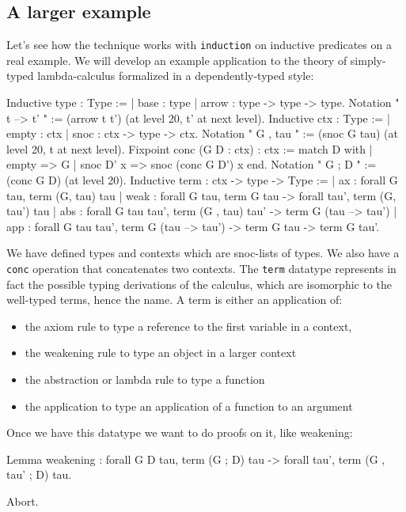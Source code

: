 \subsection{A larger example}

Let's see how the technique works with {\tt induction} on inductive
predicates on a real example. We will develop an example application to the
theory of simply-typed lambda-calculus formalized in a dependently-typed style:

\begin{coq_example*}
Inductive type : Type :=
| base : type
| arrow : type -> type -> type.
Notation " t --> t' " := (arrow t t') (at level 20, t' at next level).
Inductive ctx : Type :=
| empty : ctx
| snoc : ctx -> type -> ctx.
Notation " G , tau " := (snoc G tau) (at level 20, t at next level).
Fixpoint conc (G D : ctx) : ctx :=
  match D with
    | empty => G
    | snoc D' x => snoc (conc G D') x
  end.
Notation " G ; D " := (conc G D) (at level 20).
Inductive term : ctx -> type -> Type :=
| ax : forall G tau, term (G, tau) tau
| weak : forall G tau, 
  term G tau -> forall tau', term (G, tau') tau
| abs : forall G tau tau', 
  term (G , tau) tau' -> term G (tau --> tau')
| app : forall G tau tau', 
  term G (tau --> tau') -> term G tau -> term G tau'.
\end{coq_example*}

We have defined types and contexts which are snoc-lists of types. We
also have a {\tt conc} operation that concatenates two contexts.
The {\tt term} datatype represents in fact the possible typing
derivations of the calculus, which are isomorphic to the well-typed
terms, hence the name. A term is either an application of:
\begin{itemize}
\item the axiom rule to type a reference to the first variable in a context,
\item the weakening rule to type an object in a larger context
\item the abstraction or lambda rule to type a function
\item the application to type an application of a function to an argument
\end{itemize}

Once we have this datatype we want to do proofs on it, like weakening:

\begin{coq_example*}
Lemma weakening : forall G D tau, term (G ; D) tau -> 
  forall tau', term (G , tau' ; D) tau.
\end{coq_example*}
\begin{coq_eval}
  Abort.
\end{coq_eval}

